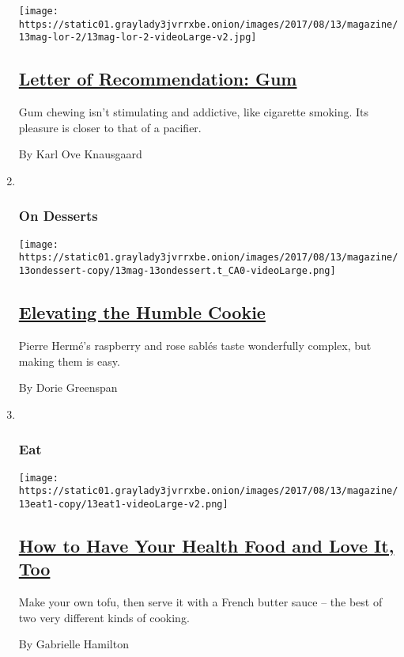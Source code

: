 \begin{enumerate}
  \texttt{[image: https://static01.graylady3jvrrxbe.onion/images/2017/08/13/magazine/13mag-lor-2/13mag-lor-2-videoLarge-v2.jpg]}

  \hypertarget{letter-of-recommendation-gum}{%
  \subsection{\texorpdfstring{\href{/2017/08/10/magazine/letter-of-recommendation-gum.html}{Letter
  of Recommendation:
  Gum}}{Letter of Recommendation: Gum}}\label{letter-of-recommendation-gum}}

  Gum chewing isn't stimulating and addictive, like cigarette smoking.
  Its pleasure is closer to that of a pacifier.

  By Karl Ove Knausgaard
\item ~
  \hypertarget{on-desserts}{%
  \subsubsection{On Desserts}\label{on-desserts}}

  \texttt{[image: https://static01.graylady3jvrrxbe.onion/images/2017/08/13/magazine/13ondessert-copy/13mag-13ondessert.t\_CA0-videoLarge.png]}

  \hypertarget{elevating-the-humble-cookie}{%
  \subsection{\texorpdfstring{\href{/2017/08/11/magazine/elevating-the-humble-cookie.html}{Elevating
  the Humble
  Cookie}}{Elevating the Humble Cookie}}\label{elevating-the-humble-cookie}}

  Pierre Hermé's raspberry and rose sablés taste wonderfully complex,
  but making them is easy.

  By Dorie Greenspan
\item ~
  \hypertarget{eat}{%
  \subsubsection{Eat}\label{eat}}

  \texttt{[image: https://static01.graylady3jvrrxbe.onion/images/2017/08/13/magazine/13eat1-copy/13eat1-videoLarge-v2.png]}

  \hypertarget{how-to-have-your-health-food-and-love-it-too}{%
  \subsection{\texorpdfstring{\href{/2017/08/10/magazine/how-to-have-your-health-food-and-love-it-too.html}{How
  to Have Your Health Food and Love It,
  Too}}{How to Have Your Health Food and Love It, Too}}\label{how-to-have-your-health-food-and-love-it-too}}

  Make your own tofu, then serve it with a French butter sauce -- the
  best of two very different kinds of cooking.

  By Gabrielle Hamilton
\end{enumerate}

